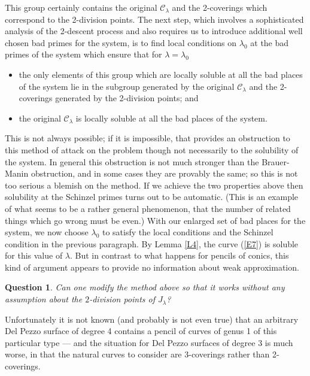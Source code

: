 \documentclass[12pt]{article}
\def\gl{{\lambda}}
\def\sC{{\mathcal C}}
\def\bpr{\begin{question} \label}
\def\epr{\end{question}}
\newtheorem{question}{Question}
\begin{document}
This group certainly contains the original $\sC_\gl$ and the 2-coverings which
correspond to the 2-division points. The next step, which involves a
sophisticated analysis of the 2-descent process and also requires us to
introduce additional well chosen bad primes for the
system, is to find local conditions
on $\gl_0$ at the bad primes of the system which ensure that for $\gl=\gl_0$
\begin{itemize}
\item the only elements of this group which are locally soluble at all the bad
places of the system lie in the subgroup generated by the original $\sC_\gl$
and the 2-coverings generated by the 2-division points; and
\item the original $\sC_\gl$ is locally soluble at all the bad places of the
system.
\end{itemize}
This is not always possible; if it is impossible, that provides an obstruction
to this method of attack on the problem
though not necessarily to the solubility of the system. In general this
obstruction is not much stronger than the Brauer-Manin obstruction, and in some
cases they are provably the same; so this
is not too serious a blemish on the method. If we achieve
the two properties above then solubility at the Schinzel
primes turns out to be
automatic. (This is an example of what seems to be a rather
general phenomenon,
that the number of related things which go wrong must be even.) With our
enlarged set of bad places for the system, we now choose $\gl_0$ to satisfy
the local conditions and the Schinzel condition in the previous paragraph. By
Lemma \ref{L4}, the curve (\ref{E7}) is soluble for this value of $\gl$.
But in contrast to what happens for pencils of conics, this kind of
argument appears to provide no information about weak approximation.
\bpr{Q12} Can one modify the method above so that it works without any
assumption about the $2$-division points of $J_\gl$?
\epr

Unfortunately it is not known (and probably is not even true) that an arbitrary
Del Pezzo surface of degree 4 contains a pencil of curves of genus 1 of this
particular type --- and the situation for Del Pezzo surfaces of degree 3 is
much worse, in that the natural curves to consider are 3-coverings
rather than 2-coverings.
\end{document}
